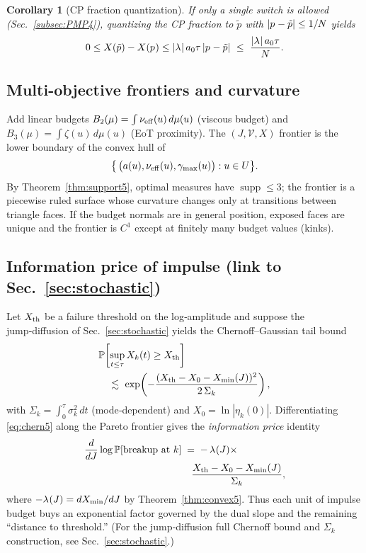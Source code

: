 \documentclass[aps,pre,twocolumn,showpacs,superscriptaddress]{revtex4-2}
\newtheorem{corollary}[theorem]{Corollary}
\theoremstyle{definition}
\newcommand{\PP}{\mathbb{P}}
\begin{document}
\begin{corollary}[CP fraction quantization]
If only a \emph{single} switch is allowed (Sec.~\ref{subsec:PMP4}), quantizing the CP fraction to $\tilde p$ with $|p^{\*}-\tilde p|\le 1/N$ yields
\begin{equation}\label{eq:gap-quant5}
0\le X(\tilde p)-X(p^{\*})\le |\lambda^{\*}|\,a_0\tau\,|p^{\*}-\tilde p|\ \le\ \frac{|\lambda^{\*}|\,a_0\tau}{N}.
\end{equation}
\end{corollary}

\subsection{Multi-objective frontiers and curvature}\label{subsec:multiobj5}

Add linear budgets $B_2(\mu)=\int \nu_{\rm eff}(u)\,d\mu(u)$ (viscous budget) and $B_3(\mu)=\int \zeta(u)\,d\mu(u)$ (EoT proximity). The $(J,\mathcal{V},X)$ frontier is the lower boundary of the convex hull of
\[
\big\{\,\big(a(u),\nu_{\rm eff}(u),\gamma_{\max}(u)\big):u\in U\big\}.
\]
By Theorem~\ref{thm:support5}, optimal measures have $\operatorname{supp}\le 3$; the frontier is a piecewise ruled surface whose curvature changes only at transitions between triangle faces. If the budget normals are in general position, exposed faces are unique and the frontier is $C^1$ except at finitely many budget values (kinks).

\subsection{Information price of impulse (link to Sec.~\ref{sec:stochastic})}\label{subsec:info5}

Let $X_{\rm th}$ be a failure threshold on the log‑amplitude and suppose the jump‑diffusion of Sec.~\ref{sec:stochastic} yields the Chernoff–Gaussian tail bound
\begin{align}\label{eq:chern5}
&\PP\!\left[\sup_{t\le \tau}X_k(t)\ge X_{\rm th}\right]\nonumber\\ 
&\quad\lesssim\ \exp\!\left(-\frac{(X_{\rm th}-X_0-X_{\min}(J))^2}{2\,\Sigma_k}\right),
\end{align}
with $\Sigma_k=\int_0^\tau \sigma_k^2\,dt$ (mode‑dependent) and $X_0=\ln|\eta_k(0)|$.
Differentiating \eqref{eq:chern5} along the Pareto frontier gives the \emph{information price} identity
\begin{align}\label{eq:info-price5}
\frac{d}{dJ}\log \PP[\text{breakup at }k] &\;=\; -\,\lambda^{\*}(J)\times\nonumber\\
&\quad\frac{X_{\rm th}-X_0-X_{\min}(J)}{\Sigma_k},
\end{align}
where $-\lambda^{\*}(J)=dX_{\min}/dJ$ by Theorem~\ref{thm:convex5}. Thus each unit of impulse budget buys an exponential factor governed by the dual slope and the remaining “distance to threshold.” (For the jump‑diffusion full Chernoff bound and \(\Sigma_k\) construction, see Sec.~\ref{sec:stochastic}.)
\end{document}
